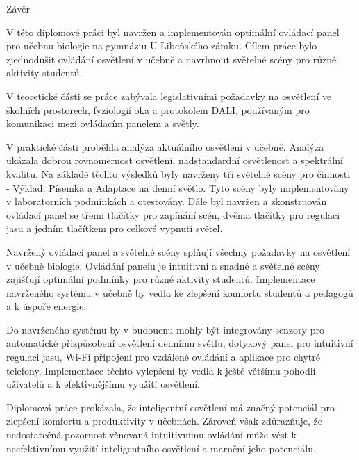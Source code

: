 \nonum\chap Závěr

V této diplomové práci byl navržen a implementován optimální ovládací panel pro učebnu
biologie na gymnáziu U Libeňského zámku.
Cílem práce bylo zjednodušit ovládání osvětlení v učebně a navrhnout světelné scény pro různé aktivity studentů.


V teoretické části se práce zabývala legislativními požadavky na osvětlení ve školních prostorech,
fyziologií oka a protokolem DALI, používaným pro komunikaci mezi ovládacím panelem a světly.


V praktické části proběhla analýza aktuálního osvětlení v učebně.
Analýza ukázala dobrou rovnomernost osvětlení, nadstandardní osvětlenost a spektrální kvalitu.
Na základě těchto výsledků byly navrženy tři světelné scény pro činnosti -
Výklad, Písemka a Adaptace na denní světlo.
Tyto scény byly implementovány v laboratorních podmínkách a otestovány.
Dále byl navržen a zkonstruován ovládací panel se třemi tlačítky pro zapínání scén,
dvěma tlačítky pro regulaci jasu a jedním tlačítkem pro celkové vypnutí světel.



Navržený ovládací panel a světelné scény splňují všechny požadavky na osvětlení v učebně biologie.
Ovládání panelu je intuitivní a snadné a světelné scény zajišťují optimální podmínky pro různé aktivity studentů.
Implementace navrženého systému v učebně by vedla ke zlepšení komfortu studentů a pedagogů a k úspoře energie.

Do navrženého systému by v budoucnu mohly být integrovány senzory pro automatické přizpůsobení
osvětlení dennímu světlu, dotykový panel pro intuitivní regulaci jasu,
Wi-Fi připojení pro vzdálené ovládání a aplikace pro chytré telefony.
Implementace těchto vylepšení by vedla k ještě většímu pohodlí uživatelů a k efektivnějšímu využití osvětlení.


Diplomová práce prokázala, že inteligentní osvětlení má značný potenciál
pro zlepšení komfortu a produktivity v učebnách.
Zároveň však zdůrazňuje, že nedostatečná pozornost věnovaná
intuitivnímu ovládání může vést k neefektivnímu využití inteligentního osvětlení a marnění jeho potenciálu.






